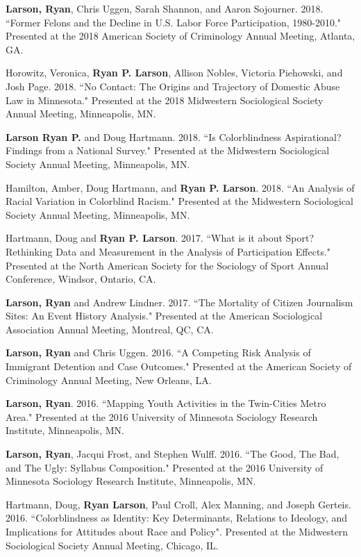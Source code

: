 \documentclass[letterpaper]{article}
\renewenvironment{itemize}{
  \begin{list}{}{
    \setlength{\leftmargin}{1.5em}
  }
}{
  \end{list}
}
\begin{document}
\begin{itemize}
\item \textbf{Larson, Ryan}, Chris Uggen, Sarah Shannon, and Aaron Sojourner. 2018. ``Former Felons and the Decline in U.S. Labor Force Participation, 1980-2010." Presented at the 2018 American Society of Criminology Annual Meeting, Atlanta, GA. 
\item Horowitz, Veronica, \textbf{Ryan P. Larson}, Allison Nobles, Victoria Piehowski, and Josh Page.  2018. ``No Contact: The Origins and Trajectory of Domestic Abuse Law in Minnesota." Presented at the 2018 Midwestern Sociological Society Annual Meeting, Minneapolis, MN. 
\item \textbf{Larson Ryan P.} and Doug Hartmann. 2018. ``Is Colorblindness Aspirational? Findings from a National Survey." Presented at the Midwestern Sociological Society Annual Meeting, Minneapolis, MN. 
\item Hamilton, Amber, Doug Hartmann, and \textbf{Ryan P. Larson}. 2018. ``An Analysis of Racial Variation in Colorblind Racism." Presented at the Midwestern Sociological Society Annual Meeting, Minneapolis, MN. 
\item Hartmann, Doug and \textbf{Ryan P. Larson}. 2017. ``What is it about Sport? Rethinking Data and Measurement in the Analysis of Participation Effects."  Presented at the North American Society for the Sociology of Sport Annual Conference, Windsor, Ontario, CA. 
\item \textbf{Larson, Ryan} and Andrew Lindner. 2017. ``The Mortality of Citizen Journalism Sites: An Event History Analysis." Presented at the American Sociological Association Annual Meeting, Montreal, QC, CA.
\item \textbf{Larson, Ryan} and Chris Uggen. 2016. ``A Competing Risk Analysis of Immigrant Detention and Case Outcomes." Presented at the American Society of Criminology Annual Meeting, New Orleans, LA. 
\item \textbf{Larson, Ryan}. 2016. ``Mapping Youth Activities in the Twin-Cities Metro Area." Presented at the 2016 University of Minnesota Sociology Research Institute, Minneapolis, MN. 
\item \textbf{Larson, Ryan}, Jacqui Frost, and Stephen Wulff. 2016. ``The Good, The Bad, and The Ugly: Syllabus Composition." Presented at the 2016 University of Minnesota Sociology Research Institute, Minneapolis, MN. 
\item Hartmann, Doug, \textbf{Ryan Larson}, Paul Croll, Alex Manning,  and Joseph Gerteis. 2016. ``Colorblindness as Identity:  Key Determinants, Relations to Ideology, and Implications for Attitudes about Race and Policy". Presented at the Midwestern Sociological Society Annual Meeting, Chicago, IL. 

\end{itemize}
\end{document}
